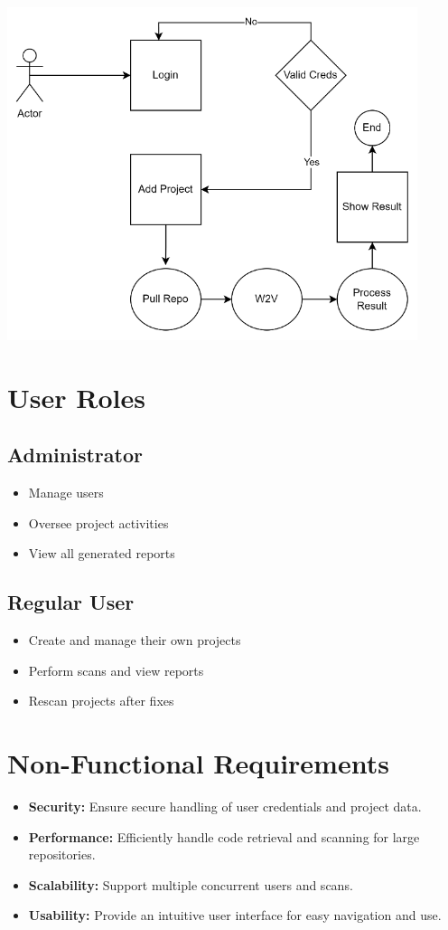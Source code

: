 \includegraphics[width=0.9\textwidth]{pictures/workflow.png}

\section*{User Roles}
\subsection*{Administrator}
\begin{itemize}
    \item Manage users
    \item Oversee project activities
    \item View all generated reports
\end{itemize}

\subsection*{Regular User}
\begin{itemize}
    \item Create and manage their own projects
    \item Perform scans and view reports
    \item Rescan projects after fixes
\end{itemize}

\section*{Non-Functional Requirements}
\begin{itemize}
    \item \textbf{Security:} Ensure secure handling of user credentials and project data.
    \item \textbf{Performance:} Efficiently handle code retrieval and scanning for large repositories.
    \item \textbf{Scalability:} Support multiple concurrent users and scans.
    \item \textbf{Usability:} Provide an intuitive user interface for easy navigation and use.
\end{itemize}

